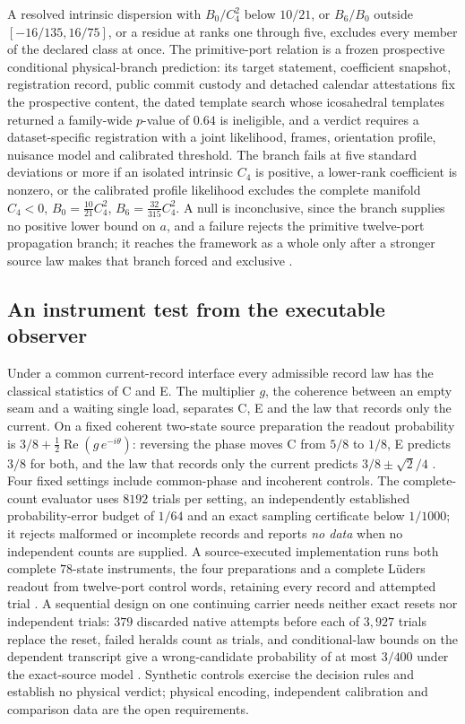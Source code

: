 \documentclass[11pt]{article}
\theoremstyle{definition}
\theoremstyle{remark}
\begin{document}
A resolved intrinsic dispersion with $B_0/C_4^2$ below $10/21$, or $B_6/B_0$
outside $[-16/135,16/75]$, or a residue at ranks one through five, excludes
every member of the declared class at once. The primitive-port relation is a
frozen prospective conditional physical-branch prediction: its target
statement, coefficient snapshot, registration record, public commit custody
and detached calendar attestations fix the prospective content, the dated
template search whose icosahedral templates returned a family-wide $p$-value
of $0.64$ is ineligible, and a verdict requires a dataset-specific
registration with a joint likelihood, frames, orientation profile, nuisance
model and calibrated threshold. The branch fails at five standard deviations
or more if an isolated intrinsic $C_4$ is positive, a lower-rank coefficient
is nonzero, or the calibrated profile likelihood excludes the complete
manifold $C_4<0$, $B_0=\tfrac{10}{21}C_4^2$, $B_6=\tfrac{32}{315}C_4^2$. A
null is inconclusive, since the branch supplies no positive lower bound on
$a$, and a failure rejects the primitive twelve-port propagation branch; it
reaches the framework as a whole only after a stronger source law makes that
branch forced and exclusive \cite{ophregister}.

\subsection{An instrument test from the executable observer}

Under a common current-record interface every admissible record law has
the classical statistics of C and E. The multiplier $g$, the coherence
between an empty seam and a waiting single load, separates C, E and the law
that records only the current. On a fixed coherent two-state source preparation the readout
probability is $3/8+\tfrac12\operatorname{Re}(g\,e^{-i\theta})$: reversing
the phase moves C from $5/8$ to $1/8$, E predicts $3/8$ for both, and the law
that records only the current predicts $3/8\pm\sqrt2/4$ \cite{ophrecordlaws}. Four fixed
settings include common-phase and incoherent controls. The complete-count
evaluator uses $8192$ trials per setting, an independently established
probability-error budget of $1/64$ and an exact sampling certificate below
$1/1000$; it rejects malformed or incomplete records and reports
\emph{no data} when no independent counts are supplied. A source-executed
implementation runs both complete $78$-state instruments, the four
preparations and a complete L\"uders readout from twelve-port control words,
retaining every record and attempted trial \cite{ophspine}. A sequential
design on one continuing carrier needs neither exact resets nor independent
trials: $379$ discarded native attempts before each of $3{,}927$ trials
replace the reset, failed heralds count as trials, and conditional-law bounds
on the dependent transcript give a wrong-candidate probability of at most
$3/400$ under the exact-source model \cite{ophprotocol}. Synthetic
controls exercise the decision rules and establish no physical verdict;
physical encoding, independent calibration and comparison data are the open
requirements.
\end{document}
